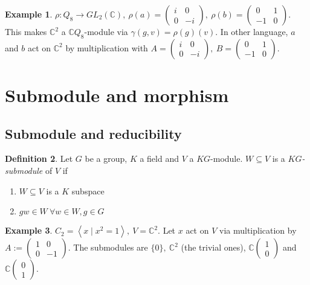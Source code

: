 \documentclass{article}
\newcommand{\la}{\left\langle}
\newcommand{\ra}{\right\rangle}
\newcommand{\C}{\mathbb{C}}
\theoremstyle{definition}
\newtheorem{defn}{Definition}[subsection]
\newtheorem{example}[defn]{Example}
\begin{document}
\begin{example}
$\rho:Q_8\rightarrow GL_2(\C),\ \rho(a)=\begin{pmatrix}i&0\\0&-i\end{pmatrix},\ \rho(b)=\begin{pmatrix}0&1\\-1&0\end{pmatrix}$. This makes $\C^2$ a $\C Q_8$-module via $\gamma(g,v)=\rho(g)(v)$. In other language, $a$ and $b$ act on $\C^2$ by multiplication with $A=\begin{pmatrix}i&0\\0&-i\end{pmatrix},\ B=\begin{pmatrix}0&1\\-1&0\end{pmatrix}$.
\end{example}

\section{Submodule and morphism}
\subsection{Submodule and reducibility}
\begin{defn}
Let $G$ be a group, $K$ a field and $V$ a $KG$-module. $W\subseteq V$ is a $KG$\textit{-submodule} of $V$ if
\begin{enumerate}
\item $W\subseteq V$ is a $K$ subspace
\item $gw\in W \ \forall w\in W, g\in G$
\end{enumerate}
\end{defn}

\begin{example}
$C_2=\la x\mid x^2=1\ra,\ V=\C^2$. Let $x$ act on $V$ via multiplication by $A:=\begin{pmatrix}1&0\\0&-1\end{pmatrix}$. The submodules are $\{0\},\ \C^2$ (the trivial ones), $\C\begin{pmatrix}1\\0\end{pmatrix}$ and  $\C\begin{pmatrix}0\\1\end{pmatrix}$.
\end{example}
\end{document}
